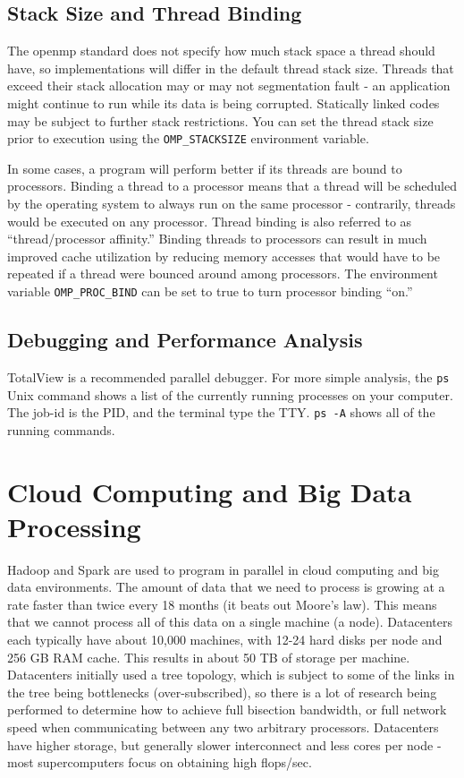 \documentclass[10pt]{article}
\begin{document}
\begin{flushleft}
\subsection{Stack Size and Thread Binding}

The \gls{openmp} standard does not specify how much stack space a thread should have, so implementations will differ in the default thread stack size. Threads that exceed their stack allocation may or may not segmentation fault - an application might continue to run while its data is being corrupted. Statically linked codes may be subject to further stack restrictions. You can set the thread stack size prior to execution using the {\tt OMP\_STACKSIZE} environment variable. 

In some cases, a program will perform better if its threads are bound to processors. Binding a thread to a processor means that a thread will be scheduled  by the operating system to always run on the same processor - contrarily, threads would be executed on any processor.  Thread binding is also referred to as ``thread/processor affinity.'' Binding threads to processors can result in much improved cache utilization by reducing memory accesses that would have to be repeated if a thread were bounced around among processors. The environment variable {\tt OMP\_PROC\_BIND} can be set to true to turn processor binding ``on.'' 

\subsection{Debugging and Performance Analysis}

TotalView is a recommended parallel debugger. For more simple analysis, the {\tt ps} Unix command shows a list of the currently running processes on your computer. The job-id is the PID, and the terminal type the TTY. {\tt ps -A} shows all of the running commands. 

\section{Cloud Computing and Big Data Processing}

Hadoop and Spark are used to program in parallel in cloud computing and big data environments. The amount of data that we need to process is growing at a rate faster than twice every 18 months (it beats out Moore's law). This means that we cannot process all of this data on a single machine (a node). Datacenters each typically have about 10,000 machines, with 12-24 hard disks per node and 256 GB RAM cache. This results in about 50 TB of storage per machine. Datacenters initially used a tree topology, which is subject to some of the links in the tree being bottlenecks (over-subscribed), so there is a lot of research being performed to determine how to achieve full bisection bandwidth, or full network speed when communicating between any two arbitrary processors. Datacenters have higher storage, but generally slower interconnect and less cores per node - most supercomputers focus on obtaining high flops/sec.


\end{flushleft}
\end{document}
